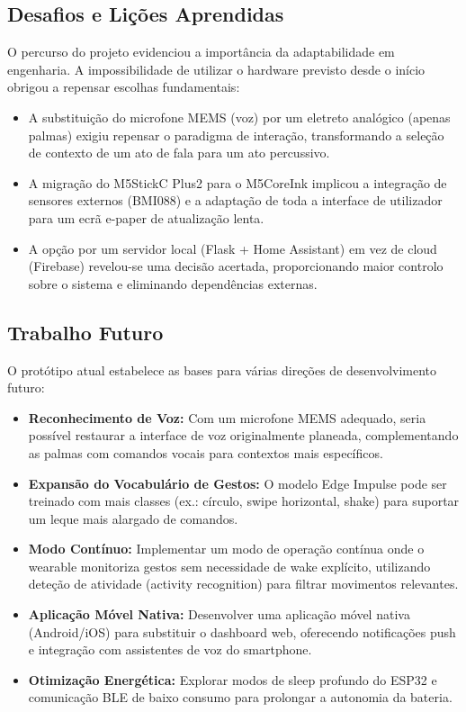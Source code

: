 \documentclass[11pt, a4paper]{article}
\begin{document}
\subsection{Desafios e Lições Aprendidas}

O percurso do projeto evidenciou a importância da adaptabilidade em engenharia. A impossibilidade de utilizar o hardware previsto desde o início obrigou a repensar escolhas fundamentais:

\begin{itemize}
    \item A substituição do microfone MEMS (voz) por um eletreto analógico (apenas palmas) exigiu repensar o paradigma de interação, transformando a seleção de contexto de um ato de fala para um ato percussivo.
    \item A migração do M5StickC Plus2 para o M5CoreInk implicou a integração de sensores externos (BMI088) e a adaptação de toda a interface de utilizador para um ecrã e-paper de atualização lenta.
    \item A opção por um servidor local (Flask + Home Assistant) em vez de cloud (Firebase) revelou-se uma decisão acertada, proporcionando maior controlo sobre o sistema e eliminando dependências externas.
\end{itemize}

\subsection{Trabalho Futuro}

O protótipo atual estabelece as bases para várias direções de desenvolvimento futuro:

\begin{itemize}
    \item \textbf{Reconhecimento de Voz:} Com um microfone MEMS adequado, seria possível restaurar a interface de voz originalmente planeada, complementando as palmas com comandos vocais para contextos mais específicos.
    \item \textbf{Expansão do Vocabulário de Gestos:} O modelo Edge Impulse pode ser treinado com mais classes (ex.: círculo, swipe horizontal, shake) para suportar um leque mais alargado de comandos.
    \item \textbf{Modo Contínuo:} Implementar um modo de operação contínua onde o wearable monitoriza gestos sem necessidade de wake explícito, utilizando deteção de atividade (activity recognition) para filtrar movimentos relevantes.
    \item \textbf{Aplicação Móvel Nativa:} Desenvolver uma aplicação móvel nativa (Android/iOS) para substituir o dashboard web, oferecendo notificações push e integração com assistentes de voz do smartphone.
    \item \textbf{Otimização Energética:} Explorar modos de sleep profundo do ESP32 e comunicação BLE de baixo consumo para prolongar a autonomia da bateria.
\end{itemize}
\end{document}
